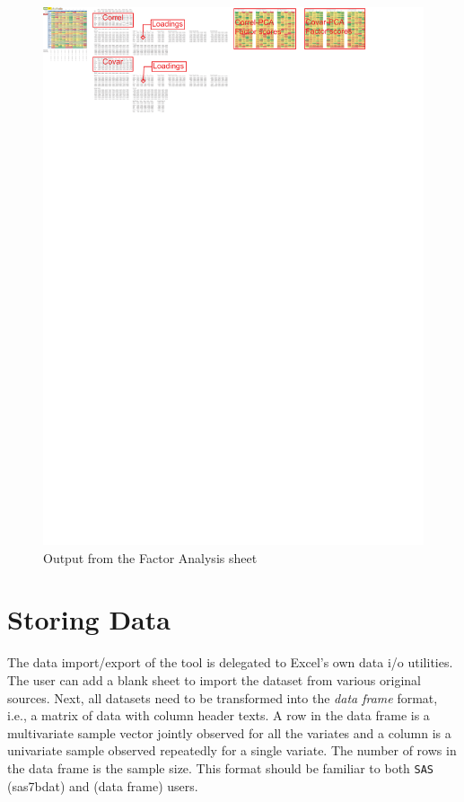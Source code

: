\documentclass[article]{jss}
\begin{document}
        \begin{figure}[!tbh]
          \includegraphics[width=\linewidth,keepaspectratio=true]{img/FactorSheetOutput_markup}
          \centering{}\protect\caption{Output from the Factor Analysis sheet}\label{fig:FactorSheetOutput_markup}
        \end{figure}

        
        \section[data]{Storing Data}
        The data import/export of the tool is delegated to Excel's own data i/o utilities. The user can add a blank sheet to import the dataset from various original sources. Next, all datasets need to be transformed into the \textit{data frame} format, i.e., a matrix of data with column header texts. A row in the data frame is a multivariate sample vector jointly observed for all the variates and a column is a univariate sample observed repeatedly for a single variate. The number of rows in the data frame is the sample size. This format should be familiar to both \texttt{SAS} (sas7bdat) and  (data frame) users. 
        
\end{document}
